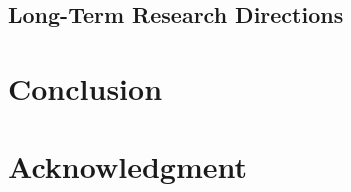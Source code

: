 \documentclass[conference]{IEEEtran}
\begin{document}
\subsection{Long-Term Research Directions}

\section{Conclusion}

\section*{Acknowledgment}



\end{document}
